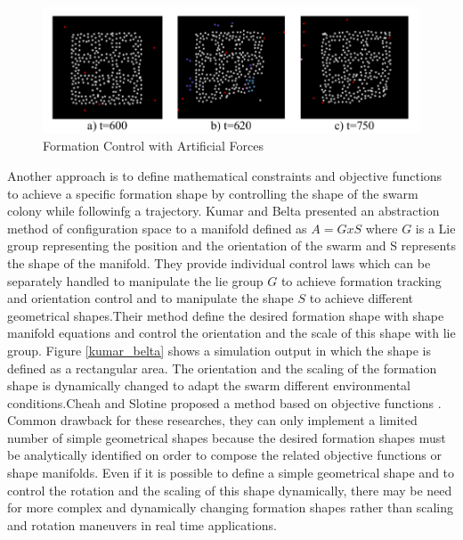 \begin{figure}[H]
	\caption{Formation Control with Artificial Forces \cite{24}} \label{izgara_ref}
	\centering
	\includegraphics[scale = 0.4]{potential}
\end{figure}


Another approach is to define mathematical constraints and objective functions to achieve a specific formation shape by controlling the shape of the swarm colony while followinfg a trajectory.  Kumar and Belta \cite{25} presented an abstraction method of configuration space to a manifold defined as $A  = G x S$ where $G$ is a Lie group representing the position and the orientation of the swarm  and S represents the shape of the manifold.  They provide individual control laws which can be separately handled to manipulate the lie group $G$ to achieve formation tracking and orientation control and to manipulate the shape $S$ to achieve different geometrical shapes.Their method define the desired formation shape with shape manifold equations and control the orientation and the scale of this shape with lie group. Figure \ref{kumar_belta}
shows a simulation output in which the shape is defined as a rectangular area. The orientation and the scaling of the formation shape is dynamically changed to adapt the swarm different environmental conditions.Cheah and Slotine \cite{8} proposed a method based on objective functions . Common drawback for these researches, they can only implement a limited number of simple geometrical shapes because the desired formation shapes must be analytically identified on order to compose the related objective functions or shape manifolds. Even if it is possible to define a simple geometrical shape and to control the rotation and the scaling of this shape dynamically, there may be need for more complex and dynamically changing formation shapes rather than scaling and rotation maneuvers in real time applications. 



